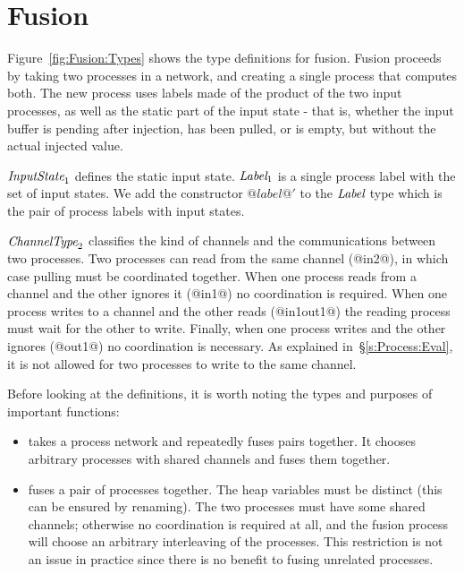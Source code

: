 \section{Fusion}
\label{s:Fusion}




Figure~\ref{fig:Fusion:Types} shows the type definitions for fusion.
Fusion proceeds by taking two processes in a network, and creating a single process that computes both.
The new process uses labels made of the product of the two input processes, as well as the static part of the input state - that is, whether the input buffer is pending after injection, has been pulled, or is empty, but without the actual injected value.


$\textit{InputState}_1$ defines the static input state. $\textit{Label}_1$ is a single process label with the set of input states. We add the constructor $@label@'$ to the $\textit{Label}$ type which is the pair of process labels with input states.

$\textit{ChannelType}_2$ classifies the kind of channels and the communications between two processes.
Two processes can read from the same channel (@in2@), in which case pulling must be coordinated together.
When one process reads from a channel and the other ignores it (@in1@) no coordination is required.
When one process writes to a channel and the other reads (@in1out1@) the reading process must wait for the other to write.
Finally, when one process writes and the other ignores (@out1@) no coordination is necessary.
As explained in~\S\ref{s:Process:Eval}, it is not allowed for two processes to write to the same channel.

Before looking at the definitions, it is worth noting the types and purposes of important functions:
\begin{itemize}
\item
{} takes a process network and repeatedly fuses pairs together. 
It chooses arbitrary processes with shared channels and fuses them together.

\item
{} fuses a pair of processes together.
The heap variables must be distinct (this can be ensured by renaming).
The two processes must have some shared channels; otherwise no coordination is required at all, and the fusion process will choose an arbitrary interleaving of the processes.
This restriction is not an issue in practice since there is no benefit to fusing unrelated processes.
\end{itemize}

